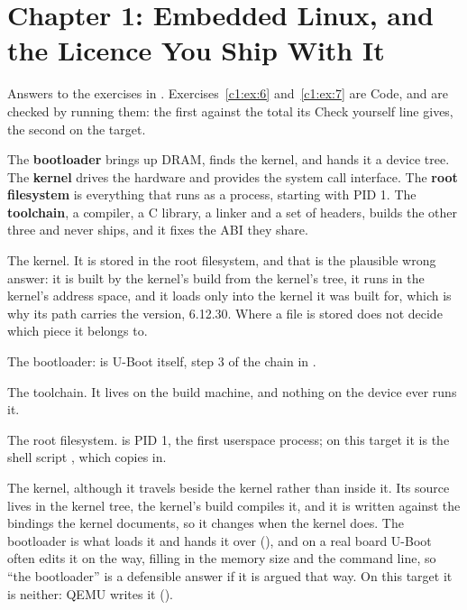 
\section{Chapter 1: Embedded Linux, and the Licence You Ship With It}
\label{sol:sec:c1}
Answers to the exercises in . Exercises~\ref{c1:ex:6} and~\ref{c1:ex:7}
are Code, and are checked by running them: the first against the total its Check yourself line
gives, the second on the target.


The \textbf{bootloader} brings up DRAM, finds the kernel, and hands it a device tree. The
\textbf{kernel} drives the hardware and provides the system call interface. The \textbf{root
filesystem} is everything that runs as a process, starting with PID 1. The \textbf{toolchain}, a
compiler, a C library, a linker and a set of headers, builds the other three and never ships, and
it fixes the ABI they share.

 The kernel. It is stored in the root filesystem, and that is the plausible wrong answer:
it is built by the kernel's build from the kernel's tree, it runs in the kernel's address space,
and it loads only into the kernel it was built for, which is why its path carries the version,
6.12.30. Where a file is stored does not decide which piece it belongs to.

 The bootloader:  is U-Boot itself, step 3 of the chain in
.

 The toolchain. It lives on the build machine, and nothing on the device ever runs it.

 The root filesystem.  is PID 1, the first userspace process; on this target it
is the shell script , which  copies in.

 The kernel, although it travels beside the kernel rather than inside it. Its source lives
in the kernel tree, the kernel's build compiles it, and it is written against the bindings the
kernel documents, so it changes when the kernel does. The bootloader is what loads it and hands it
over (), and on a real board U-Boot often edits it on the way, filling in the
memory size and the command line, so ``the bootloader'' is a defensible answer if it is argued that
way. On this target it is neither: QEMU writes it ().

